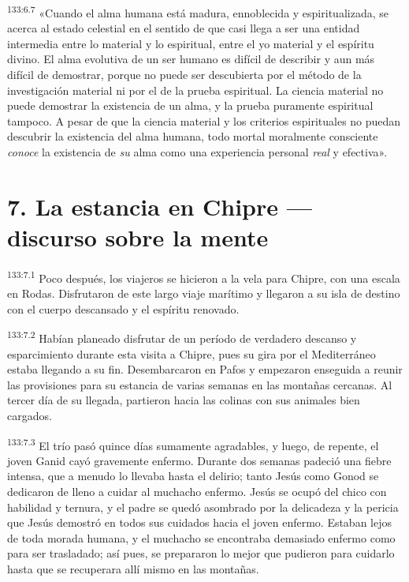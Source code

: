 \par
\textsuperscript{133:6.7} «Cuando el alma humana está madura, ennoblecida y espiritualizada, se acerca al estado celestial en el sentido de que casi llega a ser una entidad intermedia entre lo material y lo espiritual, entre el yo material y el espíritu divino. El alma evolutiva de un ser humano es difícil de describir y aun más difícil de demostrar, porque no puede ser descubierta por el método de la investigación material ni por el de la prueba espiritual. La ciencia material no puede demostrar la existencia de un alma, y la prueba puramente espiritual tampoco. A pesar de que la ciencia material y los criterios espirituales no puedan descubrir la existencia del alma humana, todo mortal moralmente consciente \textit{conoce} la existencia de \textit{su} alma como una experiencia personal \textit{real} y efectiva».

\section*{7. La estancia en Chipre --- discurso sobre la mente}
\par
\textsuperscript{133:7.1} Poco después, los viajeros se hicieron a la vela para Chipre, con una escala en Rodas. Disfrutaron de este largo viaje marítimo y llegaron a su isla de destino con el cuerpo descansado y el espíritu renovado.

\par
\textsuperscript{133:7.2} Habían planeado disfrutar de un período de verdadero descanso y esparcimiento durante esta visita a Chipre, pues su gira por el Mediterráneo estaba llegando a su fin. Desembarcaron en Pafos y empezaron enseguida a reunir las provisiones para su estancia de varias semanas en las montañas cercanas. Al tercer día de su llegada, partieron hacia las colinas con sus animales bien cargados.

\par
\textsuperscript{133:7.3} El trío pasó quince días sumamente agradables, y luego, de repente, el joven Ganid cayó gravemente enfermo. Durante dos semanas padeció una fiebre intensa, que a menudo lo llevaba hasta el delirio; tanto Jesús como Gonod se dedicaron de lleno a cuidar al muchacho enfermo. Jesús se ocupó del chico con habilidad y ternura, y el padre se quedó asombrado por la delicadeza y la pericia que Jesús demostró en todos sus cuidados hacia el joven enfermo. Estaban lejos de toda morada humana, y el muchacho se encontraba demasiado enfermo como para ser trasladado; así pues, se prepararon lo mejor que pudieron para cuidarlo hasta que se recuperara allí mismo en las montañas.


